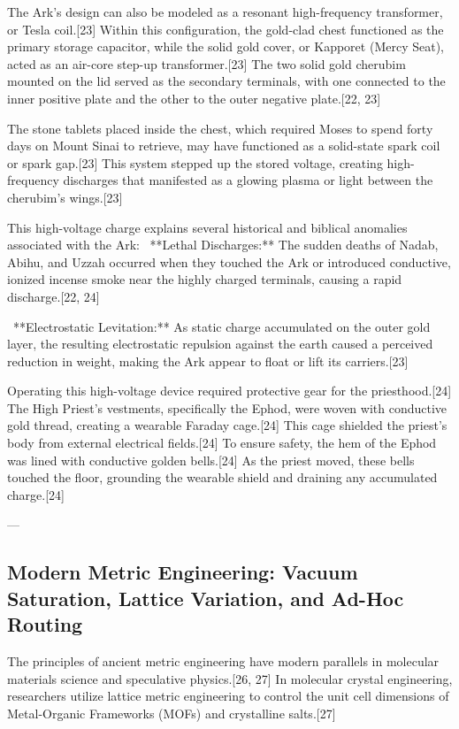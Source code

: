 \documentclass[aps,prd,11pt,onecolumn,superscriptaddress,nofootinbib,floatfix]{revtex4-2}
\begin{document}
The Ark's design can also be modeled as a resonant high-frequency transformer, or Tesla coil.[23] Within this configuration, the gold-clad chest functioned as the primary storage capacitor, while the solid gold cover, or Kapporet (Mercy Seat), acted as an air-core step-up transformer.[23] The two solid gold cherubim mounted on the lid served as the secondary terminals, with one connected to the inner positive plate and the other to the outer negative plate.[22, 23]


The stone tablets placed inside the chest, which required Moses to spend forty days on Mount Sinai to retrieve, may have functioned as a solid-state spark coil or spark gap.[23] This system stepped up the stored voltage, creating high-frequency discharges that manifested as a glowing plasma or light between the cherubim's wings.[23]


This high-voltage charge explains several historical and biblical anomalies associated with the Ark:
\textbullet~**Lethal Discharges:** The sudden deaths of Nadab, Abihu, and Uzzah occurred when they touched the Ark or introduced conductive, ionized incense smoke near the highly charged terminals, causing a rapid discharge.[22, 24]

\textbullet~**Electrostatic Levitation:** As static charge accumulated on the outer gold layer, the resulting electrostatic repulsion against the earth caused a perceived reduction in weight, making the Ark appear to float or lift its carriers.[23]



Operating this high-voltage device required protective gear for the priesthood.[24] The High Priest's vestments, specifically the Ephod, were woven with conductive gold thread, creating a wearable Faraday cage.[24] This cage shielded the priest's body from external electrical fields.[24] To ensure safety, the hem of the Ephod was lined with conductive golden bells.[24] As the priest moved, these bells touched the floor, grounding the wearable shield and draining any accumulated charge.[24]


---


\subsection{Modern Metric Engineering: Vacuum Saturation, Lattice Variation, and Ad-Hoc Routing}
The principles of ancient metric engineering have modern parallels in molecular materials science and speculative physics.[26, 27] In molecular crystal engineering, researchers utilize lattice metric engineering to control the unit cell dimensions of Metal-Organic Frameworks (MOFs) and crystalline salts.[27]
\end{document}
